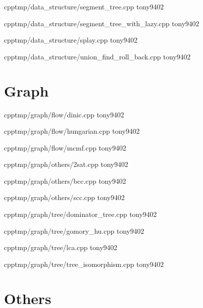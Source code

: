 {}
{}
{}
{cpp}{tmp/data_structure/segment_tree.cpp}
{tony9402}



{}
{}
{}
{cpp}{tmp/data_structure/segment_tree_with_lazy.cpp}
{tony9402}



{}
{}
{}
{cpp}{tmp/data_structure/splay.cpp}
{tony9402}



{}
{}
{}
{cpp}{tmp/data_structure/union_find_roll_back.cpp}
{tony9402}


\section{Graph}


{}
{}
{}
{cpp}{tmp/graph/flow/dinic.cpp}
{tony9402}



{}
{}
{}
{cpp}{tmp/graph/flow/hungarian.cpp}
{tony9402}



{}
{}
{}
{cpp}{tmp/graph/flow/mcmf.cpp}
{tony9402}



{}
{}
{}
{cpp}{tmp/graph/others/2sat.cpp}
{tony9402}



{}
{}
{}
{cpp}{tmp/graph/others/bcc.cpp}
{tony9402}



{}
{}
{}
{cpp}{tmp/graph/others/scc.cpp}
{tony9402}



{}
{}
{}
{cpp}{tmp/graph/tree/dominator_tree.cpp}
{tony9402}



{}
{}
{}
{cpp}{tmp/graph/tree/gomory_hu.cpp}
{tony9402}



{}
{}
{}
{cpp}{tmp/graph/tree/lca.cpp}
{tony9402}



{}
{}
{}
{cpp}{tmp/graph/tree/tree_isomorphism.cpp}
{tony9402}


\section{Others}


